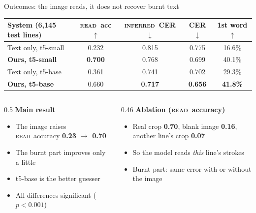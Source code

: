 \documentclass[aspectratio=169,11pt]{beamer}
\newcommand{\READ}{\textsc{read}}
\newcommand{\INF}{\textsc{inferred}}
\begin{document}
\begin{frame}{Outcomes: the image reads, it does not recover burnt text}
\centering
\footnotesize
\begin{tabular}{@{}lcccc@{}}
\toprule
System (6{,}145 test lines) & \READ\ acc $\uparrow$ & \INF\ CER $\downarrow$ & CER $\downarrow$ & 1st word $\uparrow$\\
\midrule
Text only, t5-small & 0.232 & 0.815 & 0.775 & 16.6\%\\
\textbf{Ours, t5-small} & \textbf{0.700} & 0.768 & 0.699 & 40.1\%\\
Text only, t5-base & 0.361 & 0.741 & 0.702 & 29.3\%\\
\textbf{Ours, t5-base} & 0.660 & \textbf{0.717} & \textbf{0.656} & \textbf{41.8\%}\\
\bottomrule
\end{tabular}

\vspace{0.6em}
\raggedright
\begin{columns}[T]
\begin{column}{0.5\textwidth}
\textbf{Main result}
\begin{itemize}
\item The image raises \READ\ accuracy \alert{\textbf{0.23 $\rightarrow$ 0.70}}
\item The burnt part improves only a little
\item t5-base is the better guesser
\item All differences significant ($p<0.001$)
\end{itemize}
\end{column}
\begin{column}{0.46\textwidth}
\textbf{Ablation (\READ\ accuracy)}
\begin{itemize}
\item Real crop \textbf{0.70}, blank image \textbf{0.16}, another line's crop \textbf{0.07}
\item So the model reads \emph{this} line's strokes
\item Burnt part: same error with or without the image
\end{itemize}
\end{column}
\end{columns}
\end{frame}
\end{document}
